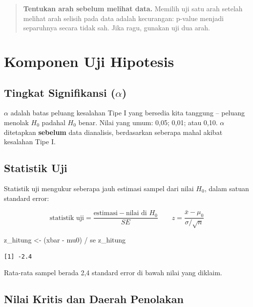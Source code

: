 \documentclass[
  indonesian,
  letterpaper,
]{book}
\newenvironment{Shaded}{\begin{snugshade}}{\end{snugshade}}
\newcommand{\NormalTok}[1]{\textcolor[rgb]{0.00,0.23,0.31}{#1}}
\newcommand{\OtherTok}[1]{\textcolor[rgb]{0.00,0.23,0.31}{#1}}
\newcommand{\SpecialCharTok}[1]{\textcolor[rgb]{0.37,0.37,0.37}{#1}}
\begin{document}
\begin{quote}
\textbf{Tentukan arah sebelum melihat data.} Memilih uji satu arah
setelah melihat arah selisih pada data adalah kecurangan: p-value
menjadi separuhnya secara tidak sah. Jika ragu, gunakan uji dua arah.
\end{quote}

\section{Komponen Uji Hipotesis}\label{komponen-uji-hipotesis}

\subsection{\texorpdfstring{Tingkat Signifikansi
(\(\alpha\))}{Tingkat Signifikansi (\textbackslash alpha)}}\label{tingkat-signifikansi-alpha}

\(\alpha\) adalah batas peluang kesalahan Tipe I yang bersedia kita
tanggung -- peluang menolak \(H_0\) padahal \(H_0\) benar. Nilai yang
umum: 0,05; 0,01; atau 0,10. \(\alpha\) ditetapkan \textbf{sebelum} data
dianalisis, berdasarkan seberapa mahal akibat kesalahan Tipe I.

\subsection{Statistik Uji}\label{statistik-uji}

Statistik uji mengukur seberapa jauh estimasi sampel dari nilai \(H_0\),
dalam satuan standard error:

\[
\text{statistik uji} = \frac{\text{estimasi} - \text{nilai di } H_0}{SE}
\qquad
z = \frac{\bar{x} - \mu_0}{\sigma/\sqrt{n}}
\]

\begin{Shaded}
\begin{Highlighting}[]
\NormalTok{z\_hitung }\OtherTok{\textless{}{-}}\NormalTok{ (xbar }\SpecialCharTok{{-}}\NormalTok{ mu0) }\SpecialCharTok{/}\NormalTok{ se}
\NormalTok{z\_hitung}
\end{Highlighting}
\end{Shaded}

\begin{verbatim}
[1] -2.4
\end{verbatim}

Rata-rata sampel berada 2,4 standard error di bawah nilai yang diklaim.

\subsection{Nilai Kritis dan Daerah
Penolakan}\label{nilai-kritis-dan-daerah-penolakan}
\end{document}
